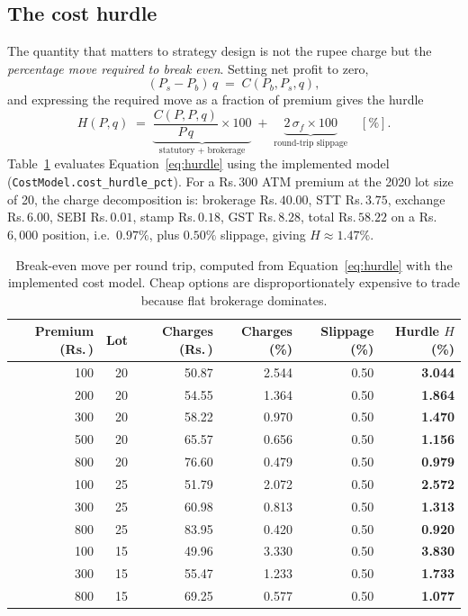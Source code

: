 \documentclass[11pt,a4paper]{article}
\newcommand{\rs}{Rs.\,}                 %
\newcommand{\code}[1]{\texttt{#1}}
\begin{document}
\subsection{The cost hurdle}\label{sec:hurdle}

The quantity that matters to strategy design is not the rupee charge but the
\emph{percentage move required to break even}. Setting net profit to zero,
\begin{equation}
(P_s - P_b)\,q \;=\; C(P_b,P_s,q),
\end{equation}
and expressing the required move as a fraction of premium gives the hurdle
\begin{equation}
H(P,q) \;=\; \underbrace{\frac{C(P,P,q)}{P\,q}\times 100}_{\text{statutory + brokerage}}
\;+\; \underbrace{2\,\sigma_{\!f}\times 100}_{\text{round-trip slippage}} \quad [\%].
\label{eq:hurdle}
\end{equation}
Table~\ref{tab:hurdle} evaluates Equation~\eqref{eq:hurdle} using the implemented model
(\code{CostModel.cost\_hurdle\_pct}). For a \rs$300$ ATM premium at the 2020 lot size of
20, the charge decomposition is: brokerage \rs$40.00$, STT \rs$3.75$, exchange
\rs$6.00$, SEBI \rs$0.01$, stamp \rs$0.18$, GST \rs$8.28$, total \rs$58.22$ on a
\rs$6{,}000$ position, i.e.\ $0.97\%$, plus $0.50\%$ slippage, giving
$H \approx 1.47\%$.

\begin{table}[H]
\centering\small
\begin{tabular}{@{}rrrrrr@{}}
\toprule
\textbf{Premium (\rs)} & \textbf{Lot} & \textbf{Charges (\rs)} & \textbf{Charges (\%)} &
\textbf{Slippage (\%)} & \textbf{Hurdle $H$ (\%)}\\
\midrule
100 & 20 & 50.87 & 2.544 & 0.50 & \textbf{3.044}\\
200 & 20 & 54.55 & 1.364 & 0.50 & \textbf{1.864}\\
300 & 20 & 58.22 & 0.970 & 0.50 & \textbf{1.470}\\
500 & 20 & 65.57 & 0.656 & 0.50 & \textbf{1.156}\\
800 & 20 & 76.60 & 0.479 & 0.50 & \textbf{0.979}\\
\midrule
100 & 25 & 51.79 & 2.072 & 0.50 & \textbf{2.572}\\
300 & 25 & 60.98 & 0.813 & 0.50 & \textbf{1.313}\\
800 & 25 & 83.95 & 0.420 & 0.50 & \textbf{0.920}\\
\midrule
100 & 15 & 49.96 & 3.330 & 0.50 & \textbf{3.830}\\
300 & 15 & 55.47 & 1.233 & 0.50 & \textbf{1.733}\\
800 & 15 & 69.25 & 0.577 & 0.50 & \textbf{1.077}\\
\bottomrule
\end{tabular}
\caption{Break-even move per round trip, computed from Equation~\eqref{eq:hurdle} with
the implemented cost model. Cheap options are disproportionately expensive to trade
because flat brokerage dominates.}
\label{tab:hurdle}
\end{table}
\end{document}
